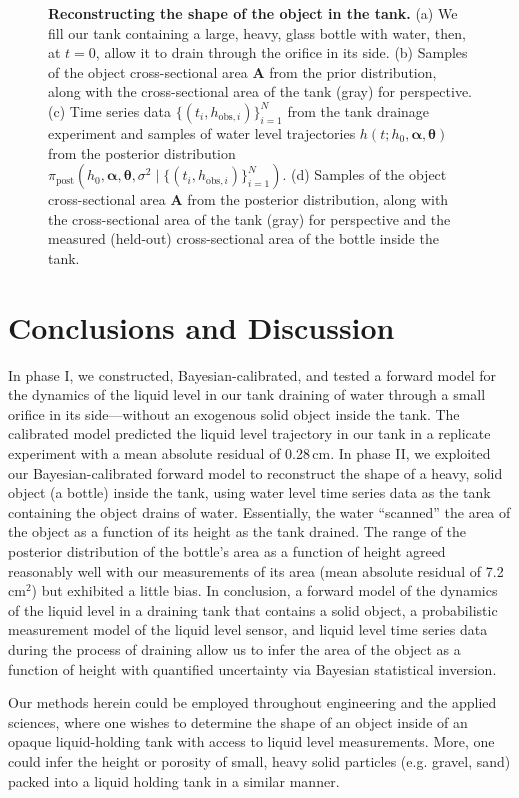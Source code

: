 \documentclass[openacc]{rsproca_new}%
\newcommand\thedata {$\{(t_i,h_{\text{obs}, i})\}_{i=1}^{N}$\xspace}
\newcommand\thedatanomath {\{(t_i,h_{\text{obs}, i})\}_{i=1}^{N}}
\newcommand\themodel {$h(t; h_0, \boldsymbol \alpha, \boldsymbol\theta)$\xspace}
\newcommand\thevars{h_0, \boldsymbol \alpha, \boldsymbol \theta, \sigma^2}
\begin{document}
\begin{figure}[h!]
    \caption{
      \textbf{Reconstructing the shape of the object in the tank.} 
      (a) We fill our tank containing a large, heavy, glass bottle with water, then, at $t=0$, allow it to drain through the orifice in its side.
      (b) Samples of the object cross-sectional area $\mathbf{A}$ from the prior distribution, along with the cross-sectional area of the tank (gray) for perspective. 
      (c) Time series data \thedata from the tank drainage experiment and samples of water level trajectories \themodel from the posterior distribution $\pi_{\text{post}}(\thevars \mid \thedatanomath)$.
      (d) Samples of the object cross-sectional area $\mathbf{A}$ from the posterior distribution, along with the cross-sectional area of the tank (gray) for perspective and the measured (held-out) cross-sectional area of the bottle inside the tank. 
      }
\end{figure}

\section{Conclusions and Discussion}
In phase I, we constructed, Bayesian-calibrated, and tested a forward model for the dynamics of the liquid level in our tank draining of water through a small orifice in its side---without an exogenous solid object inside the tank.
The calibrated model predicted the liquid level trajectory in our tank in a replicate experiment with a mean absolute residual of 0.28\,cm.
In phase II, we exploited our Bayesian-calibrated forward model to reconstruct the shape of a heavy, solid object (a bottle) inside the tank, using water level time series data as the tank containing the object drains of water. Essentially, the water ``scanned'' the area of the object as a function of its height as the tank drained. 
The range of the posterior distribution of the bottle's area as a function of height agreed reasonably well with our measurements of its area (mean absolute residual of 7.2\,cm$^2$) but exhibited a little bias. 
In conclusion, a forward model of the dynamics of the liquid level in a draining tank that contains a solid object, a probabilistic measurement model of the liquid level sensor, and liquid level time series data during the process of draining allow us to infer the area of the object as a function of height with quantified uncertainty via Bayesian statistical inversion. 

Our methods herein could be employed throughout engineering and the applied sciences, where one wishes to determine the shape of an object inside of an opaque liquid-holding tank with access to liquid level measurements.
More, one could infer the height or porosity of small, heavy solid particles (e.g. gravel, sand) packed into a liquid holding tank in a similar manner. 
\end{document}
